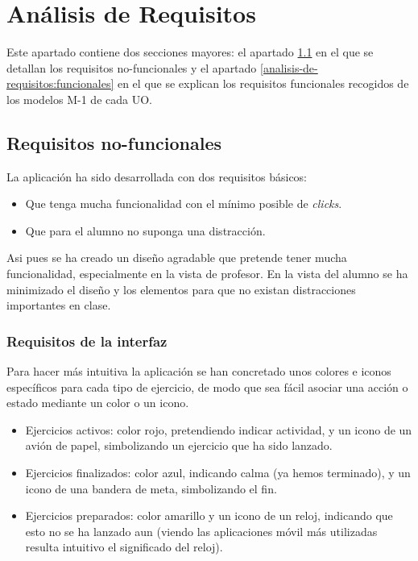 
\chapter{Análisis de Requisitos}
\label{analisis-de-requisitos}

Este apartado contiene dos secciones mayores: el apartado \ref{analisis-de-requisitos:no-funcionales} en el que se detallan los requisitos no-funcionales y el apartado \ref{analisis-de-requisitos:funcionales} en el que se explican los requisitos funcionales recogidos de los modelos M-1 de cada UO.\\

\section{Requisitos no-funcionales}
\label{analisis-de-requisitos:no-funcionales}

La aplicación ha sido desarrollada con dos requisitos básicos:

\begin{itemize}
\item Que tenga mucha funcionalidad con el mínimo posible de \textit{clicks}.
\item Que para el alumno no suponga una distracción.
\end{itemize}

Asi pues se ha creado un diseño agradable que pretende tener mucha funcionalidad, especialmente en la vista de profesor. En la vista del alumno se ha minimizado el diseño y los elementos para que no existan distracciones importantes en clase.\\

\subsection{Requisitos de la interfaz}
\label{analisis-de-requisitos:no-funcionales:interfaz}

Para hacer más intuitiva la aplicación se han concretado unos colores e iconos específicos para cada tipo de ejercicio, de modo que sea fácil asociar una acción o estado mediante un color o un icono.

\begin{itemize}
\item Ejercicios activos: color rojo, pretendiendo indicar actividad, y un icono de un avión de papel, simbolizando un ejercicio que ha sido lanzado.
\item Ejercicios finalizados: color azul, indicando calma (ya hemos terminado), y un icono de una bandera de meta, simbolizando el fin.
\item Ejercicios preparados: color amarillo y un icono de un reloj, indicando que esto no se ha lanzado aun (viendo las aplicaciones móvil más utilizadas resulta intuitivo el significado del reloj).
\end{itemize}

